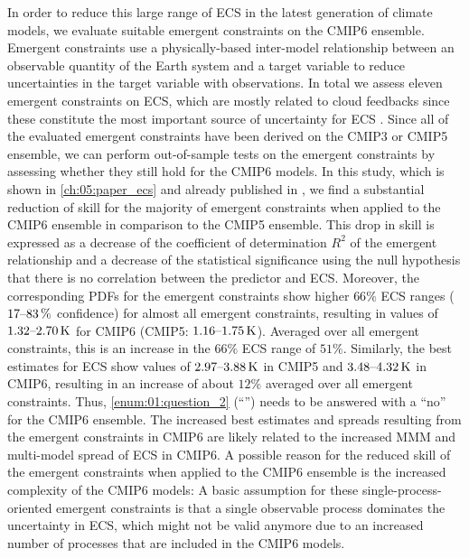 In order to reduce this large range of \ac{ECS} in the latest generation of
climate  models, we evaluate suitable emergent constraints on the \acs{CMIP}6
ensemble. Emergent constraints use a physically-based inter-model relationship
between an observable quantity of the Earth system and a target variable to
reduce uncertainties in the target variable with observations. In total we
assess eleven emergent constraints on \ac{ECS}, which are mostly related to
cloud feedbacks since these constitute the most important source of uncertainty
for \ac{ECS} \autocite{Boucher2013, Flato2013}. Since all of the evaluated
emergent constraints have been derived on the \acs{CMIP}3 or \acs{CMIP}5
ensemble, we can perform out-of-sample tests on the emergent constraints by
assessing whether they still hold for the \acs{CMIP}6 models. In this study,
which is shown in \cref{ch:05:paper_ecs} and already published in
\textcite{Schlund2020a}, we find a substantial reduction of skill for the
majority of emergent constraints when applied to the \acs{CMIP}6 ensemble in
comparison to the \acs{CMIP}5 ensemble. This drop in skill is expressed as a
decrease of the coefficient of determination $R^2$ of the emergent relationship
and a decrease of the statistical significance using the null hypothesis that
there is no correlation between the predictor and \ac{ECS}. Moreover, the
corresponding \acp{PDF} for the emergent constraints show higher $66 \unit{\%}$
\ac{ECS} ranges ($\rangeunit{17}{83}{\%}$ confidence) for almost all emergent
constraints, resulting in values of $\rangeunit{1.32}{2.70}{K}$ for \acs{CMIP}6
(\acs{CMIP}5: $\rangeunit{1.16}{1.75}{K}$). Averaged over all emergent
constraints, this is an increase in the $66 \unit{\%}$ \ac{ECS} range of $51
\unit{\%}$. Similarly, the best estimates for \ac{ECS} show values of
$\rangeunit{2.97}{3.88}{K}$ in \acs{CMIP}5 and $\rangeunit{3.48}{4.32}{K}$ in
\acs{CMIP}6, resulting in an increase of about $12 \unit{\%}$ averaged over all
emergent constraints. Thus, \cref{enum:01:question_2}
(\enquote{\emph{\KeyScienceQuestionTwo{}}}) needs to be answered with a
\enquote{no} for the \acs{CMIP}6 ensemble. The increased best estimates and
spreads resulting from the emergent constraints in \acs{CMIP}6 are likely
related to the increased \ac{MMM} and multi-model spread of \ac{ECS} in
\acs{CMIP}6. A possible reason for the reduced skill of the emergent
constraints when applied to the \acs{CMIP}6 ensemble is the increased
complexity of the \acs{CMIP}6 models: A basic assumption for these
single-process-oriented emergent constraints is that a single observable
process dominates the uncertainty in \ac{ECS}, which might not be valid anymore
due to an increased number of processes that are included in the \acs{CMIP}6
models.

